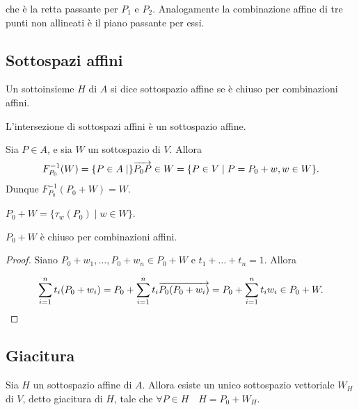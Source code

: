  che è la retta passante per $P_1$ e $P_2.$ Analogamente la combinazione affine di tre punti non allineati
 è il piano passante per essi.
 
	\subsection{Sottospazi affini}
 
 Un sottoinsieme $H$ di $A$ si dice sottospazio affine se è chiuso per combinazioni affini.
 
 \vspace{0.5cm}
 
 \begin{remark}
 L'intersezione di sottospazi affini è un sottospazio affine.
 \end{remark}
 
 \vspace{0.5cm}
 
 \begin{example}
 Sia $P\in A$, e sia $W$ un sottospazio di $V.$ Allora
 $$F^{-1}_{P_0}(W)=\{P\in A\;|\}\overrightarrow{P_0P}\in W=\{P\in V\;|\;P=P_0+w, w\in W\}.$$
 Dunque $F^{-1}_{P_0}(P_0+W)=W$.
 \end{example}
 
 \vspace{0.5cm}
 
 \begin{remark}
 $P_0+W=\{\tau_w(P_0)\;|\;w\in W\}$.
 \end{remark}
 
 \vspace{0.5cm}
 
 \begin{proposition}
 $P_0+W$ è chiuso per combinazioni affini.
 \end{proposition}
 
 \begin{proof}
 Siano $P_0+w_1,\dots,P_0+w_n\in P_0+W$ e $t_1+\ldots+t_n=1$. Allora
 
 \[
	\sum_{i=1}^nt_i(P_0+w_i)=P_0+\sum_{i=1}^nt_i\overrightarrow{P_0(P_0+w_i)}=P_0+\sum_{i=1}^nt_iw_i\in P_0+W.
 \]
 \end{proof}
 
 \subsection{Giacitura}
 
 \begin{proposition}
 Sia $H$ un sottospazio affine di $A$. Allora esiste un unico sottospazio vettoriale
 $W_H$ di $V$,  detto giacitura di $H$, tale che $\forall P\in H\quad H=P_0+W_H$.
 \end{proposition}
 
